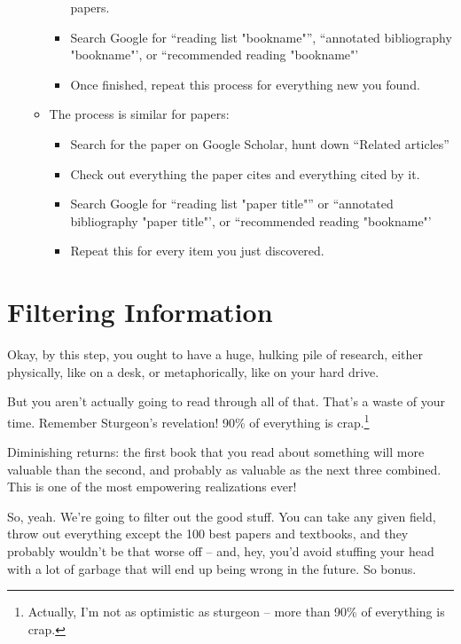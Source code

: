 \begin{enumerate}
\begin{itemize}
\begin{itemize}
      papers.
    \item Search Google for ``reading list "bookname"'', ``annotated
      bibliography "bookname"', or ``recommended reading "bookname"'
    \item Once finished, repeat this process for everything new you found.
    \end{itemize}
  \item The process is similar for papers:
    \begin{itemize}
    \item Search for the paper on Google Scholar, hunt down ``Related articles''
    \item Check out everything the paper cites and everything cited by it.
    \item Search Google for ``reading list "paper title"'' or ``annotated
      bibliography "paper title"', or ``recommended reading "bookname"'
    \item Repeat this for every item you just discovered.
    \end{itemize}
  \end{itemize}
\end{enumerate}

\section{Filtering Information}

Okay, by this step, you ought to have a huge, hulking pile of research, either
physically, like on a desk, or metaphorically, like on your hard drive.

But you aren't actually going to read through all of that. That's a waste of
your time. Remember Sturgeon's revelation! 90\% of everything is
crap.\footnote{Actually, I'm not as optimistic as sturgeon -- more than 90\% of
  everything is crap.}

Diminishing returns: the first book that you read about something will more
valuable than the second, and probably as valuable as the next three
combined. This is one of the most empowering realizations ever!


So, yeah. We're going to filter out the good stuff. You can take any given
field, throw out everything except the 100 best papers and textbooks, and they
probably wouldn't be that worse off -- and, hey, you'd avoid stuffing your head
with a lot of garbage that will end up being wrong in the future. So bonus.

